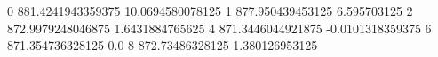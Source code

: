 0 881.4241943359375 10.0694580078125
1 877.950439453125 6.595703125
2 872.9979248046875 1.6431884765625
4 871.3446044921875 -0.0101318359375
6 871.354736328125 0.0
8 872.73486328125 1.380126953125

